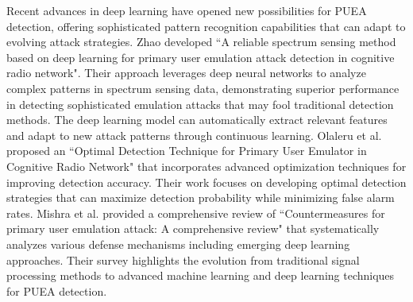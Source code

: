 Recent advances in deep learning have opened new possibilities for PUEA detection, offering sophisticated pattern recognition capabilities that can adapt to evolving attack strategies.
Zhao \cite{ref22} developed ``A reliable spectrum sensing method based on deep learning for primary user emulation attack detection in cognitive radio network". Their approach leverages deep neural networks to analyze complex patterns in spectrum sensing data, demonstrating superior performance in detecting sophisticated emulation attacks that may fool traditional detection methods. The deep learning model can automatically extract relevant features and adapt to new attack patterns through continuous learning.
Olaleru et al. \cite{ref20} proposed an ``Optimal Detection Technique for Primary User Emulator in Cognitive Radio Network" that incorporates advanced optimization techniques for improving detection accuracy. Their work focuses on developing optimal detection strategies that can maximize detection probability while minimizing false alarm rates.
Mishra et al. \cite{ref24} provided a comprehensive review of ``Countermeasures for primary user emulation attack: A comprehensive review" that systematically analyzes various defense mechanisms including emerging deep learning approaches. Their survey highlights the evolution from traditional signal processing methods to advanced machine learning and deep learning techniques for PUEA detection.



